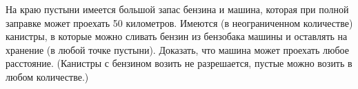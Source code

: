 \documentclass[a4paper,12pt]{article}
\begin{document}
     На краю пустыни имеется большой запас бензина и машина, которая при полной заправке может проехать 50 километров. Имеются (в неограниченном количестве) канистры, в которые можно сливать бензин из бензобака машины и оставлять на хранение (в любой точке пустыни). Доказать, что машина может проехать любое расстояние. (Канистры с бензином возить не разрешается, пустые можно возить в любом количестве.)
    
\end{document}
